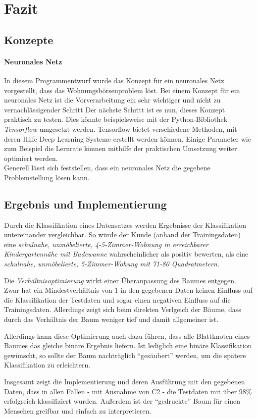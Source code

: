 \section{Fazit}\label{sec:fazit}
\subsection{Konzepte}
\paragraph{Neuronales Netz}
In diesem Programmentwurf wurde das Konzept für ein neuronales Netz vorgestellt, dass das Wohnungsbörsenproblem
löst. Bei einem Konzept für ein neuronales Netz ist die Vorverarbeitung ein sehr wichtiger und nicht zu vernachlässigender 
Schritt Der nächste Schritt ist es nun, dieses Konzept praktisch zu testen. Dies könnte beispielsweise mit der 
Python-Bibliothek \emph{Tensorflow} umgesetzt werden.
Tensorflow bietet verschiedene Methoden, mit deren Hilfe Deep Learning Systeme erstellt werden können.
Einige Parameter wie zum Beispiel die Lernrate können mithilfe der praktischen Umsetzung weiter optimiert werden. \\
Generell lässt sich feststellen, dass ein neuronales Netz die gegebene Problemstellung lösen kann. 

\subsection{Ergebnis und Implementierung}

Durch die Klassifikation eines Datensatzes werden Ergebnisse der Klassifikation untereinander vergleichbar.
So würde der Kunde (anhand der Trainingsdaten) eine  \emph{schulnahe, unmöbelierte, 4-5-Zimmer-Wohnung in erreichbarer Kindergartennähe mit Badewanne} wahrscheinlicher als positiv bewerten,
als eine \emph{schulnahe, unmöbelierte, 5-Zimmer-Wohung mit 71-80 Quadratmetern}.

Die \emph{Verhältnisoptimierung} wirkt einer Überanpassung des Baumes entgegen.
Zwar hat ein Mindestverhältnis von $1$ in den gegebenen Daten keinen Einfluss auf die Klassifikation der Testdaten und sogar einen negativen Einfluss auf die Trainingsdaten.
Allerdings zeigt sich beim direkten Verlgeich der Bäume,
dass durch das Verhältnis der Baum weniger tief und damit allgemeiner ist.

Allerdings kann diese Optimierung auch dazu führen,
dass alle Blattknoten eines Baumes das gleiche binäre Ergebnis liefern.
Ist lediglich eine binäre Klassifikation gewünscht,
so sollte der Baum nachträglich \enquote{gesäubert} werden,
um die spätere Klassifikation zu erleichtern.

Insgesamt zeigt die Implementierung und deren Ausführung mit den gegebenen Daten,
dass in allen Fällen - mit Ausnahme von C2 - die Testdaten mit über $98\%$ erfolgreich klassifiziert wurden.
Außerdem ist der \enquote{gedruckte} Baum für einen Menschen greifbar und einfach zu interpretieren.